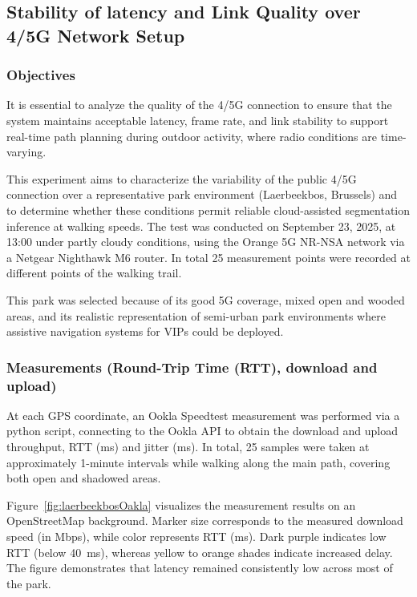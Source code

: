 \documentclass{ieeeaccess}
\begin{document}
\subsection{Stability of latency and Link Quality over 4/5G Network Setup}
\label{sec:stability}

\subsubsection{Objectives}
It is essential to analyze the quality of the 4/5G connection to ensure that the system maintains acceptable latency, frame rate, and link stability to support real-time path planning during outdoor activity, where radio conditions are time-varying.  

This experiment aims to characterize the variability of the public 4/5G connection over a representative park environment (Laerbeekbos, Brussels) and to determine whether these conditions permit reliable cloud-assisted segmentation inference at walking speeds. The test was conducted on September 23, 2025, at 13:00 under partly cloudy conditions, using the Orange 5G NR-NSA network via a Netgear Nighthawk M6 router. In total 25 measurement points were recorded at different points of the walking trail.  

This park was selected because of its good 5G coverage, mixed open and wooded areas, and its realistic representation of semi-urban park environments where assistive navigation systems for VIPs could be deployed.

\subsubsection{Measurements (Round-Trip Time (RTT), download and upload)}
At each GPS coordinate, an Ookla Speedtest measurement was performed via a python script, connecting to the Ookla API to obtain the download and upload throughput, RTT (ms) and jitter (ms).
In total, 25 samples were taken at approximately 1-minute intervals while walking along the main path, covering both open and shadowed areas.

Figure~\ref{fig:laerbeekbosOakla} visualizes the measurement results on an OpenStreetMap background.  
Marker size corresponds to the measured download speed (in Mbps), while color represents RTT (ms). Dark purple indicates low RTT (below 40\ ms), whereas yellow to orange shades indicate increased delay.  
The figure demonstrates that latency remained consistently low across most of the park.  
\end{document}

